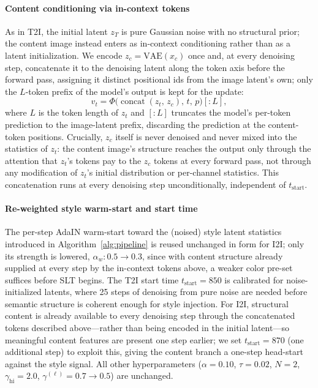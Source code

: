 \paragraph{Content conditioning via in-context tokens}
As in T2I, the initial latent $z_T$ is pure Gaussian noise with no
structural prior; the content image instead enters as in-context
conditioning rather than as a latent initialization. We encode
$z_c = \text{VAE}(x_c)$ once and, at every denoising step, concatenate it to
the denoising latent along the token axis before the forward pass, assigning
it distinct positional ids from the image latent's own; only the $L$-token
prefix of the model's output is kept for the update:
\begin{equation}
  \hat{v}_t = \Phi\bigl(\operatorname{concat}(z_t,\, z_c),\, t,\, p\bigr)[:L],
  \label{eq:adain}
\end{equation}
where $L$ is the token length of $z_t$ and $[:L]$ truncates the model's
per-token prediction to the image-latent prefix, discarding the prediction
at the content-token positions. Crucially, $z_c$ itself is never denoised and
never mixed into the statistics of $z_t$: the content image's structure
reaches the output only through the attention that $z_t$'s tokens pay to the
$z_c$ tokens at every forward pass, not through any modification of $z_t$'s
initial distribution or per-channel statistics. This concatenation runs at
every denoising step unconditionally, independent of $t_\text{start}$.

\paragraph{Re-weighted style warm-start and start time}
The per-step AdaIN warm-start toward the (noised) style latent
statistics introduced in Algorithm~\ref{alg:pipeline} is reused unchanged in
form for I2I; only its strength is lowered, $\alpha_w\!: 0.5 \to 0.3$, since
with content structure already supplied at every step by the in-context
tokens above, a weaker color pre-set suffices before SLT begins.
The T2I start time $t_\text{start}=850$ is calibrated for noise-initialized
latents, where 25 steps of denoising from pure noise are needed before
semantic structure is coherent enough for style injection.
For I2I, structural content is already available to every denoising
step through the concatenated tokens described above---rather than being
encoded in the initial latent---so meaningful content features are present
one step earlier; we set $t_\text{start}=870$ (one additional step) to
exploit this, giving the content branch a one-step head-start against the
style signal.
All other hyperparameters ($\alpha{=}0.10$, $\tau{=}0.02$, $N{=}2$,
$\gamma_\text{hi}{=}2.0$, $\gamma^{(\ell)}{=}0.7{\to}0.5$) are unchanged.

